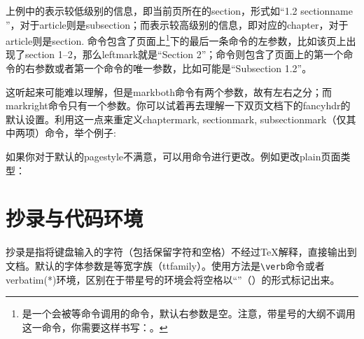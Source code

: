 {上例中的\latexline{\\rightmark}表示较低级别的信息，即当前页所在的section，形式如“1.2 sectionname ”，对于article则是subsection；而\latexline{\\leftmark}表示较高级别的信息，即对应的chapter，对于article则是section. 命令\latexline{\\leftmark}包含了页面上\latexline{\\markboth}\footnote{\latexline{\\markboth}是一个会被\latexline{\\chapter}等命令调用的命令，默认右参数是空。注意，带星号的大纲不调用这一命令，你需要这样书写：。}下的最后一条命令的左参数，比如该页上出现了section 1--2，那么leftmark就是“Section 2”；命令\latexline{\\rightmark}则包含了页面上的第一个\latexline{\\markboth}命令的右参数或者第一个\latexline{\\markright}命令的唯一参数，比如可能是“Subsection 1.2”。

这听起来可能难以理解，但是markboth命令有两个参数，故有左右之分；而markright命令只有一个参数。你可以试着再去理解一下双页文档下的fancyhdr的默认设置。利用这一点来重定义chaptermark, sectionmark, subsectionmark（仅其中两项）命令，举个例子:
\begin{latex}{}
\renewcommand{\sectionmark}[1]{\markright{\thesection.\ #1}}
\renewcommand{\chaptermark}[1]{\markboth{\MakeUppercase{%
  \chaptername}\ \thechapter.\ #1}{}}
\end{latex}

如果你对于默认的pagestyle不满意，可以用\latexline{\\fancypagestyle}命令进行更改。例如更改plain页面类型：
\begin{latex}{}
\end{latex}

\section{抄录与代码环境}
抄录是指将键盘输入的字符（包括保留字符和空格）不经过\TeX 解释，直接输出到文档。默认的字体参数是等宽字族（ttfamily）。使用方法是\verb|\verb|命令或者verbatim(*)环境，区别在于带星号的环境会将空格以“\textvisiblespace”（\latexline{\\textvisiblespace}）的形式标记出来。

}

